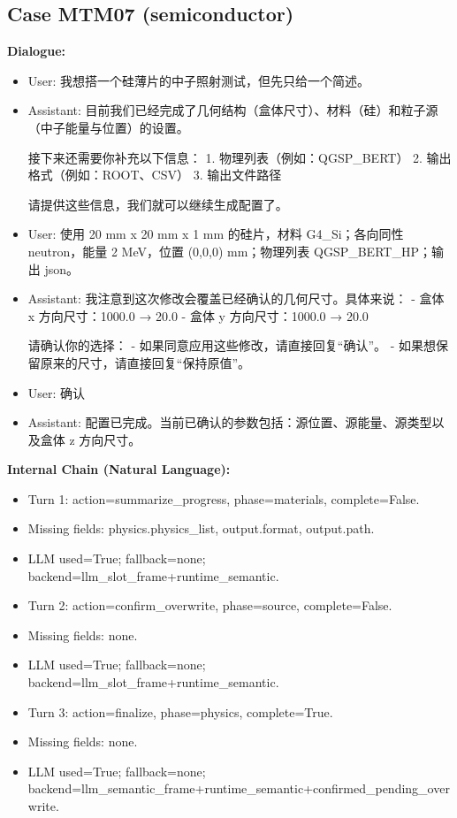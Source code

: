 \documentclass[11pt]{ctexart}
\begin{document}
\subsection{Case MTM07 (semiconductor)}
\textbf{Dialogue:}
\begin{itemize}
\item User: 我想搭一个硅薄片的中子照射测试，但先只给一个简述。
\item Assistant: 目前我们已经完成了几何结构（盒体尺寸）、材料（硅）和粒子源（中子能量与位置）的设置。

接下来还需要你补充以下信息：
1. 物理列表（例如：QGSP\_BERT）
2. 输出格式（例如：ROOT、CSV）
3. 输出文件路径

请提供这些信息，我们就可以继续生成配置了。
\item User: 使用 20 mm x 20 mm x 1 mm 的硅片，材料 G4\_Si；各向同性 neutron，能量 2 MeV，位置 (0,0,0) mm；物理列表 QGSP\_BERT\_HP；输出 json。
\item Assistant: 我注意到这次修改会覆盖已经确认的几何尺寸。具体来说：
- 盒体 x 方向尺寸：1000.0 → 20.0
- 盒体 y 方向尺寸：1000.0 → 20.0

请确认你的选择：
- 如果同意应用这些修改，请直接回复“确认”。
- 如果想保留原来的尺寸，请直接回复“保持原值”。
\item User: 确认
\item Assistant: 配置已完成。当前已确认的参数包括：源位置、源能量、源类型以及盒体 z 方向尺寸。
\end{itemize}
\textbf{Internal Chain (Natural Language):}
\begin{itemize}
\item Turn 1: action=summarize\_progress, phase=materials, complete=False.
\item Missing fields: physics.physics\_list, output.format, output.path.
\item LLM used=True; fallback=none; backend=llm\_slot\_frame+runtime\_semantic.
\item Turn 2: action=confirm\_overwrite, phase=source, complete=False.
\item Missing fields: none.
\item LLM used=True; fallback=none; backend=llm\_slot\_frame+runtime\_semantic.
\item Turn 3: action=finalize, phase=physics, complete=True.
\item Missing fields: none.
\item LLM used=True; fallback=none; backend=llm\_semantic\_frame+runtime\_semantic+confirmed\_pending\_overwrite.
\end{itemize}
\end{document}
